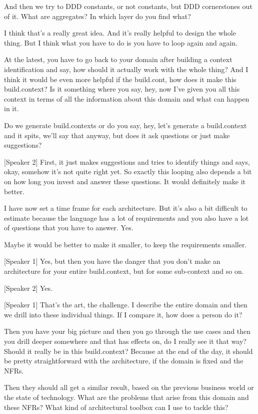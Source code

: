 And then we try to DDD constants, or not constants, but DDD cornerstones out of it. What are aggregates? In which layer do you find what?

I think that's a really great idea. And it's really helpful to design the whole thing. But I think what you have to do is you have to loop again and again.

At the latest, you have to go back to your domain after building a context identification and say, how should it actually work with the whole thing? And I think it would be even more helpful if the build.cont, how does it make this build.context? Is it something where you say, hey, now I've given you all this context in terms of all the information about this domain and what can happen in it.

Do we generate build.contexts or do you say, hey, let's generate a build.context and it spits, we'll say that anyway, but does it ask questions or just make suggestions?

[Speaker 2]
First, it just makes suggestions and tries to identify things and says, okay, somehow it's not quite right yet. So exactly this looping also depends a bit on how long you invest and answer these questions. It would definitely make it better.

I have now set a time frame for each architecture. But it's also a bit difficult to estimate because the language has a lot of requirements and you also have a lot of questions that you have to answer. Yes.

Maybe it would be better to make it smaller, to keep the requirements smaller.

[Speaker 1]
Yes, but then you have the danger that you don't make an architecture for your entire build.context, but for some sub-context and so on.

[Speaker 2]
Yes.

[Speaker 1]
That's the art, the challenge. I describe the entire domain and then we drill into these individual things. If I compare it, how does a person do it?

Then you have your big picture and then you go through the use cases and then you drill deeper somewhere and that has effects on, do I really see it that way? Should it really be in this build.context? Because at the end of the day, it should be pretty straightforward with the architecture, if the domain is fixed and the NFRs.

Then they should all get a similar result, based on the previous business world or the state of technology. What are the problems that arise from this domain and these NFRs? What kind of architectural toolbox can I use to tackle this?

